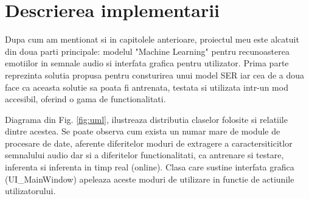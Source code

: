 \documentclass[a4paper,12pt]{book}
\begin{document}
		\chapter{Descrierea implementarii}
				Dupa cum am mentionat si in capitolele anterioare, proiectul meu este alcatuit din doua parti principale: modelul "Machine Learning" pentru recunoasterea emotiilor in semnale audio si interfata grafica pentru utilizator. Prima parte reprezinta solutia propusa pentru consturirea unui model SER iar cea de a doua face ca aceasta solutie sa poata fi antrenata, testata si utilizata intr-un mod accesibil, oferind o gama de functionalitati.\par 
				Diagrama din Fig. \ref{fig:uml}, ilustreaza distributia claselor folosite si relatiile dintre acestea. Se poate observa cum exista un numar mare de module de procesare de date, aferente diferitelor moduri de extragere a caractersiticitlor semnalului audio dar si a diferitelor functionalitati, ca antrenare si testare, inferenta si inferenta in timp real (online). Clasa care sustine interfata grafica (UI\_MainWindow) apeleaza aceste moduri de utilizare in functie de actiunile utilizatorului. \par
				
\end{document}
